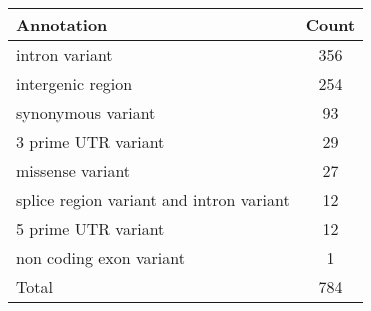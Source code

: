 \centering \begin{tabular}{l|c}
Annotation	&Count\\\hline
intron variant	&356\\
intergenic region	&254\\
synonymous variant	&93\\
3 prime UTR variant	&29\\
missense variant	&27\\
splice region variant and intron variant	&12\\
5 prime UTR variant	&12\\
non coding exon variant	&1\\
\hline
Total	&784\\
\end{tabular}

